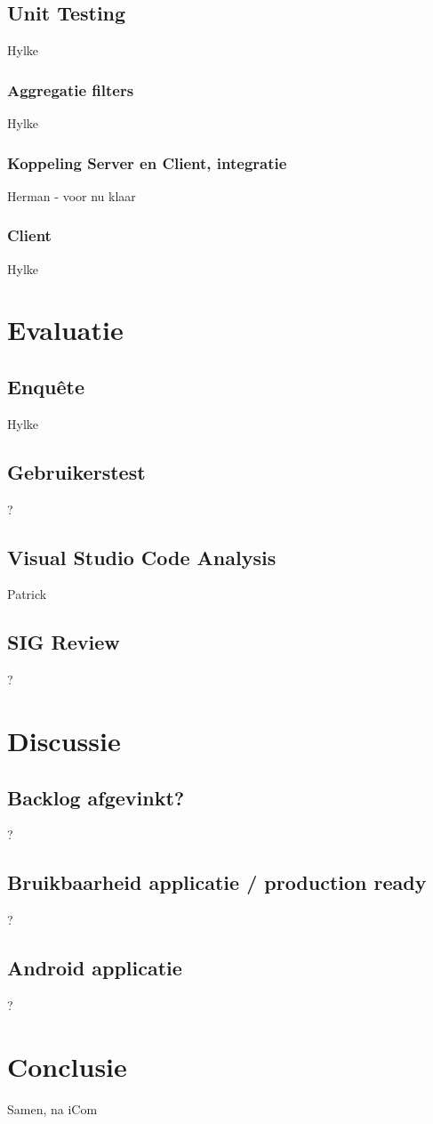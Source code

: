 	\section{Unit Testing}											Hylke
		\subsection{Aggregatie filters}								Hylke
		\subsection{Koppeling Server en Client, integratie}			Herman - voor nu klaar
		\subsection{Client}											Hylke

\chapter{Evaluatie} \label{ch:evaluatie} 
	\section{Enquête}												Hylke
	\section{Gebruikerstest}										?
	\section{Visual Studio Code Analysis}							Patrick
	\section{SIG Review}											?

\chapter{Discussie} \label{ch:discussie} 
	\section{Backlog afgevinkt?}									?
	\section{Bruikbaarheid applicatie / production ready}			?
	\section{Android applicatie}									?

\chapter{Conclusie} \label{ch:conclusie} 	Samen, na iCom
